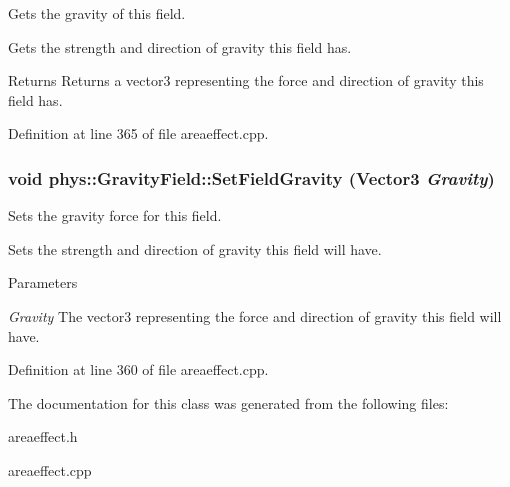 Gets the gravity of this field. 

Gets the strength and direction of gravity this field has. \begin{DoxyReturn}{Returns}
Returns a vector3 representing the force and direction of gravity this field has. 
\end{DoxyReturn}


Definition at line 365 of file areaeffect.cpp.

\hypertarget{classphys_1_1GravityField_a7cebfe216580e9ef607a2ea070cbeaec}{
\subsubsection[{SetFieldGravity}]{\setlength{\rightskip}{0pt plus 5cm}void phys::GravityField::SetFieldGravity ({\bf Vector3} {\em Gravity})}}
\label{d4/d8a/classphys_1_1GravityField_a7cebfe216580e9ef607a2ea070cbeaec}


Sets the gravity force for this field. 

Sets the strength and direction of gravity this field will have. 
\begin{DoxyParams}{Parameters}
\item[{\em Gravity}]The vector3 representing the force and direction of gravity this field will have. \end{DoxyParams}


Definition at line 360 of file areaeffect.cpp.



The documentation for this class was generated from the following files:\begin{DoxyCompactItemize}
\item 
areaeffect.h\item 
areaeffect.cpp\end{DoxyCompactItemize}
